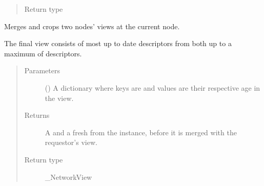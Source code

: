 \documentclass[letterpaper,10pt,english]{sphinxmanual}
\begin{document}
\begin{fulllineitems}
\begin{fulllineitems}
\begin{quote}
\begin{description}
\item[{Return type}] \leavevmode
{}

\end{description}\end{quote}

\end{fulllineitems}


\begin{fulllineitems}
\label{\detokenize{app.domain:app.domain.network_nodes.NewscastNode.shuffle_request}}
Merges and crops two nodes’ views at the current node.

The final view consists of most up to date descriptors from both
{\hyperref[\detokenize{app.domain:app.domain.network_nodes.NewscastNode.view}]{}} up to a maximum of 
descriptors.
\begin{quote}\begin{description}
\item[{Parameters}] \leavevmode
{} () \textendash{} A dictionary where keys are {\hyperref[\detokenize{app.domain:app.domain.network_nodes.Node}]{}}
and values are their respective age in the view.

\item[{Returns}] \leavevmode
A {\hyperref[\detokenize{app.domain:app.domain.network_nodes.NewscastNode.view}]{}} and a fresh 
from the  instance, before it is
merged with the requestor’s view.

\item[{Return type}] \leavevmode
\_NetworkView

\end{description}\end{quote}

\end{fulllineitems}



\end{fulllineitems}
\end{document}
